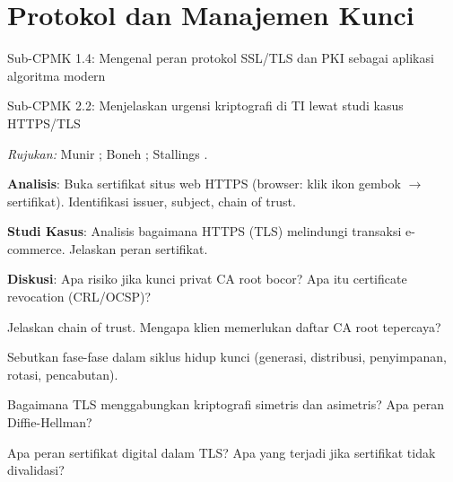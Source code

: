 \documentclass[main.tex]{subfiles}
\begin{document}
\chapter{Protokol dan Manajemen Kunci}

\begin{subcpmk}
  \item Sub-CPMK 1.4: Mengenal peran protokol SSL/TLS dan PKI sebagai aplikasi algoritma modern
  \item Sub-CPMK 2.2: Menjelaskan urgensi kriptografi di TI lewat studi kasus HTTPS/TLS
\end{subcpmk}

\noindent\textit{Rujukan:} Munir \cite{munir_slides_itb}; Boneh \cite{boneh_cs255}; Stallings \cite{stallings2017}.






\begin{aktivitas}
  \item \textbf{Analisis}: Buka sertifikat situs web HTTPS (browser: klik ikon gembok $\to$ sertifikat). Identifikasi issuer, subject, chain of trust.

  \item \textbf{Studi Kasus}: Analisis bagaimana HTTPS (TLS) melindungi transaksi e-commerce. Jelaskan peran sertifikat.

  \item \textbf{Diskusi}: Apa risiko jika kunci privat CA root bocor? Apa itu certificate revocation (CRL/OCSP)?
\end{aktivitas}


\begin{latihan}
  \item Jelaskan chain of trust. Mengapa klien memerlukan daftar CA root tepercaya?

  \item Sebutkan fase-fase dalam siklus hidup kunci (generasi, distribusi, penyimpanan, rotasi, pencabutan).

  \item Bagaimana TLS menggabungkan kriptografi simetris dan asimetris? Apa peran Diffie-Hellman?

  \item Apa peran sertifikat digital dalam TLS? Apa yang terjadi jika sertifikat tidak divalidasi?
\end{latihan}
\end{document}
